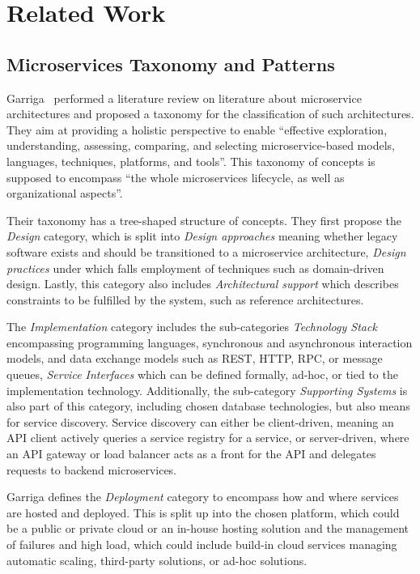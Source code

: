 \section{Related Work}\label{sec:related}

\subsection{Microservices Taxonomy and Patterns}

Garriga~\cite{Garriga2017} performed a literature review on literature about microservice architectures and proposed a taxonomy for the classification of such architectures.
They aim at providing a holistic perspective to enable ``effective exploration, understanding, assessing, comparing, and selecting microservice-based models, languages, techniques, platforms, and tools''.
This taxonomy of concepts is supposed to encompass ``the whole microservices lifecycle, as well as organizational aspects''.

Their taxonomy has a tree-shaped structure of concepts.
They first propose the \textit{Design} category, which is split into \textit{Design approaches} meaning whether legacy software exists and should be transitioned to a microservice architecture, \textit{Design practices} under which falls employment of techniques such as domain-driven design.
Lastly, this category also includes \textit{Architectural support} which describes constraints to be fulfilled by the system, such as reference architectures.

The \textit{Implementation} category includes the sub-categories \textit{Technology Stack} encompassing programming languages, synchronous and asynchronous interaction models, and data exchange models such as \ac{REST}, \ac{HTTP}, \ac{RPC}, or message queues, \textit{Service Interfaces} which can be defined formally, ad-hoc, or tied to the implementation technology.
Additionally, the sub-category \textit{Supporting Systems} is also part of this category, including chosen database technologies, but also means for service discovery.
Service discovery can either be client-driven, meaning an \ac{API} client actively queries a service registry for a service, or server-driven, where an \ac{API} gateway or load balancer acts as a front for the \ac{API} and delegates requests to backend microservices.

Garriga defines the \textit{Deployment} category to encompass how and where services are hosted and deployed.
This is split up into the chosen platform, which could be a public or private cloud or an in-house hosting solution and the management of failures and high load, which could include build-in cloud services managing automatic scaling, third-party solutions, or ad-hoc solutions.


